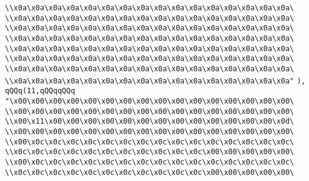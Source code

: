 \verb|\\x0a\x0a\x0a\x0a\x0a\x0a\x0a\x0a\x0a\x0a\x0a\x0a\x0a\x0a\x0a\x0a\|\newline
\verb|\\x0a\x0a\x0a\x0a\x0a\x0a\x0a\x0a\x0a\x0a\x0a\x0a\x0a\x0a\x0a\x0a\|\newline
\verb|\\x0a\x0a\x0a\x0a\x0a\x0a\x0a\x0a\x0a\x0a\x0a\x0a\x0a\x0a\x0a\x0a\|\newline
\verb|\\x0a\x0a\x0a\x0a\x0a\x0a\x0a\x0a\x0a\x0a\x0a\x0a\x0a\x0a\x0a\x0a\|\newline
\verb|\\x0a\x0a\x0a\x0a\x0a\x0a\x0a\x0a\x0a\x0a\x0a\x0a\x0a\x0a\x0a\x0a\|\newline
\verb|\\x0a\x0a\x0a\x0a\x0a\x0a\x0a\x0a\x0a\x0a\x0a\x0a\x0a\x0a\x0a\x0a\|\newline
\verb|\\x0a\x0a\x0a\x0a\x0a\x0a\x0a\x0a\x0a\x0a\x0a\x0a\x0a\x0a\x0a\x0a\|\newline
\verb|\\x0a\x0a\x0a\x0a\x0a\x0a\x0a\x0a\x0a\x0a\x0a\x0a\x0a\x0a\x0a\x0a"|\newline
\verb|),|\newline
\verb|qQQq(11,qQQqqQQq|\newline
\verb|"\x00\x00\x00\x00\x00\x00\x00\x00\x00\x00\x00\x00\x00\x00\x00\x00\|\newline
\verb|\\x00\x00\x00\x00\x00\x00\x00\x00\x00\x00\x00\x00\x00\x00\x00\x00\|\newline
\verb|\\x00\x11\x00\x00\x00\x00\x00\x00\x00\x00\x00\x00\x00\x00\x00\x0d\|\newline
\verb|\\x00\x00\x00\x00\x00\x00\x00\x00\x00\x00\x00\x00\x00\x00\x00\x00\|\newline
\verb|\\x00\x0c\x0c\x0c\x0c\x0c\x0c\x0c\x0c\x0c\x0c\x0c\x0c\x0c\x0c\x0c\|\newline
\verb|\\x0c\x0c\x0c\x0c\x0c\x0c\x0c\x0c\x0c\x0c\x0c\x00\x00\x00\x00\x00\|\newline
\verb|\\x00\x0c\x0c\x0c\x0c\x0c\x0c\x0c\x0c\x0c\x0c\x0c\x0c\x0c\x0c\x0c\|\newline
\verb|\\x0c\x0c\x0c\x0c\x0c\x0c\x0c\x0c\x0c\x0c\x0c\x00\x00\x00\x00\x00\|\newline
